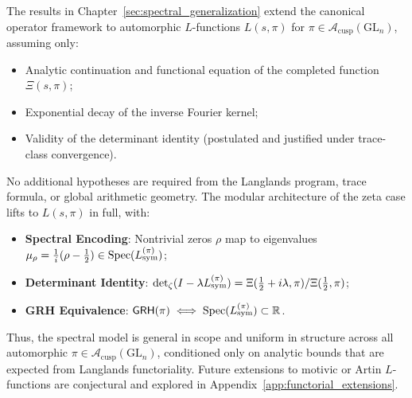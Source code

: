 \begin{remark}
\label{rem:spectral_generalization_scope}
The results in Chapter~\ref{sec:spectral_generalization} extend the canonical operator framework to automorphic \( L \)-functions \( L(s, \pi) \) for \( \pi \in \mathcal{A}_{\mathrm{cusp}}(\mathrm{GL}_n) \), assuming only:
\begin{itemize}
  \item Analytic continuation and functional equation of the completed function \( \Xi(s, \pi) \);
  \item Exponential decay of the inverse Fourier kernel;
  \item Validity of the determinant identity (postulated and justified under trace-class convergence).
\end{itemize}

No additional hypotheses are required from the Langlands program, trace formula, or global arithmetic geometry. The modular architecture of the zeta case lifts to \( L(s, \pi) \) in full, with:
\begin{itemize}
  \item \textbf{Spectral Encoding}: Nontrivial zeros \( \rho \) map to eigenvalues \( \mu_\rho = \tfrac{1}{i}(\rho - \tfrac{1}{2}) \in \operatorname{Spec}(L_{\mathrm{sym}}^{(\pi)}) \);
  \item \textbf{Determinant Identity}: \( \det\nolimits_{\zeta}(I - \lambda L_{\mathrm{sym}}^{(\pi)}) = \Xi(\tfrac{1}{2} + i\lambda, \pi)/\Xi(\tfrac{1}{2}, \pi) \);
  \item \textbf{GRH Equivalence}: \( \mathsf{GRH}(\pi) \iff \operatorname{Spec}(L_{\mathrm{sym}}^{(\pi)}) \subset \mathbb{R} \).
\end{itemize}

Thus, the spectral model is general in scope and uniform in structure across all automorphic \( \pi \in \mathcal{A}_{\mathrm{cusp}}(\mathrm{GL}_n) \), conditioned only on analytic bounds that are expected from Langlands functoriality. Future extensions to motivic or Artin \( L \)-functions are conjectural and explored in Appendix~\ref{app:functorial_extensions}.
\end{remark}
